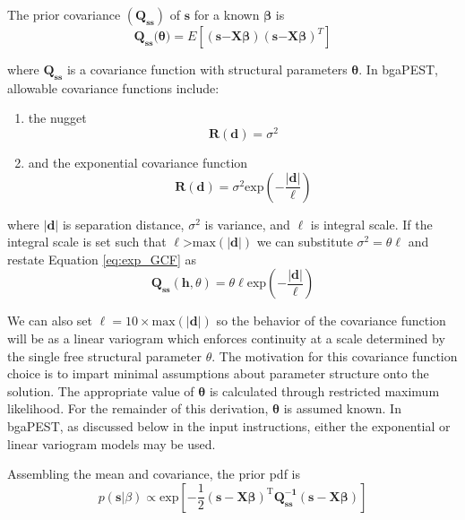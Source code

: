 \documentclass[11pt,oneside,onecolumn]{usgsreport}
\begin{document}
\begin{appendix}
The prior covariance $(\mathbf{Q_{ss}})$ of $\mathbf{s}$ for a known
$\mathbf{\beta}$ is
\[
\mathbf{Q_{ss}(}\mathbf{\theta})=E[(\mathbf{s}\mathbf{-}\mathbf{X\beta})(\mathbf{s}\mathbf{-}\mathbf{X\beta})^{T}]
\]


where $\mathbf{Q_{ss}}$ is a covariance function with structural
parameters $\mathbf{\theta}.$ In bgaPEST, allowable covariance functions
include:
\begin{enumerate}
\item the nugget
\[
\mathbf{R}\left(\mathbf{d}\right)=\sigma^{2}
\]

\item and the exponential covariance function 
\begin{equation}
\mathbf{R}(\mathbf{d})=\sigma^{2}\mathrm{exp}(\mathbf{-}\frac{\left|\mathbf{d}\right|}{\ell})\label{eq:exp_GCF}
\end{equation}

\end{enumerate}
where $\left|\mathbf{d}\right|$ is separation distance, $\sigma^{2}$
is variance, and $\ell$ is integral scale. If the integral scale
is set such that $\ell$>$\mathrm{max}(\left|\mathbf{d}\right|)$ we
can substitute $\sigma^{2}=\theta\ell$ and restate Equation \ref{eq:exp_GCF}
as
\begin{equation}
\mathbf{Q_{ss}}(\mathbf{h},\theta)=\theta\ell\mathrm{exp}(-\frac{\mathbf{\left|\mathbf{d}\right|}}{\ell})\label{eq:Qss}
\end{equation}


We can also set $\ell=10\times\mathrm{max(\mathbf{\left|d\right|})}$
so the behavior of the covariance function will be as a linear variogram
\citep{FienenWRR2008} which enforces continuity at a scale determined
by the single free structural parameter $\theta.$ The motivation
for this covariance function choice is to impart minimal assumptions
about parameter structure onto the solution. The appropriate value
of $\mathbf{\theta}$ is calculated through restricted maximum likelihood.
For the remainder of this derivation, $\mathbf{\theta}$ is assumed
known. In bgaPEST, as discussed below in the input instructions, either
the exponential or linear variogram models may be used.

Assembling the mean and covariance, the prior pdf is
\begin{equation}
p(\mathbf{s}|\beta)\propto\mathrm{exp\left[\mathbf{-}\frac{1}{2}(\mathbf{s-X\beta})^{T}\mathbf{Q_{ss}^{-1}}(\mathbf{s-X\beta})\right]}\label{eq:prior}
\end{equation}



\end{appendix}
\end{document}

